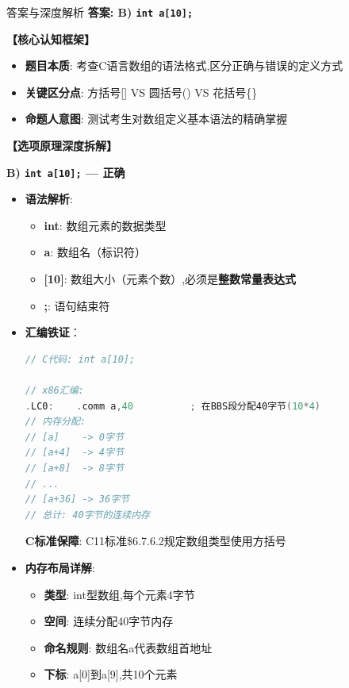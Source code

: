 \documentclass[a4paper,12pt]{article}
\begin{document}
\begin{bluebox}{答案与深度解析}
	\textbf{答案: B) \texttt{int a[10];}}

	\textbf{【核心认知框架】}
	\begin{itemize}[leftmargin=*, nosep]
		\item \textbf{题目本质}: 考查C语言数组的语法格式,区分正确与错误的定义方式
		\item \textbf{关键区分点}: 方括号[] VS 圆括号() VS 花括号\{\}
		\item \textbf{命题人意图}: 测试考生对数组定义基本语法的精确掌握
	\end{itemize}

	\textbf{【选项原理深度拆解】}

	\textbf{B) \texttt{int a[10];} — 正确}
	\begin{itemize}[leftmargin=*, nosep]
		\item \textbf{语法解析}:
		      \begin{itemize}
			      \item \textbf{int}: 数组元素的数据类型
			      \item \textbf{a}: 数组名（标识符）
			      \item \textbf{[10]}: 数组大小（元素个数）,必须是\textbf{整数常量表达式}
			      \item \textbf{;}: 语句结束符
		      \end{itemize}

		\item \textbf{汇编铁证}：
		      \begin{lstlisting}[language=C]
// C代码: int a[10];

// x86汇编:
.LC0:    .comm a,40          ; 在BBS段分配40字节(10*4)
// 内存分配:
// [a]    -> 0字节
// [a+4]  -> 4字节
// [a+8]  -> 8字节
// ...
// [a+36] -> 36字节
// 总计: 40字节的连续内存
    \end{lstlisting}
		      \textbf{C标准保障}: C11标准\$6.7.6.2规定数组类型使用方括号

		\item \textbf{内存布局详解}:
		      \begin{itemize}
			      \item \textbf{类型}: int型数组,每个元素4字节
			      \item \textbf{空间}: 连续分配40字节内存
			      \item \textbf{命名规则}: 数组名a代表数组首地址
			      \item \textbf{下标}: a[0]到a[9],共10个元素
		      \end{itemize}


\end{itemize}
\end{bluebox}
\end{document}

